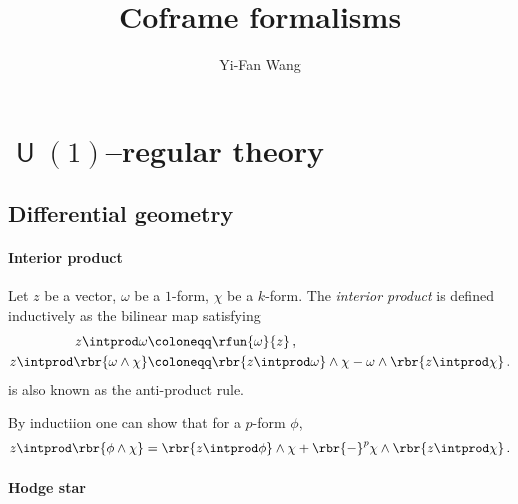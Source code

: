 \documentclass[a4paper]{article}
\title{Coframe formalisms}
\author{Yi-Fan Wang}
\begin{document}
\maketitle


\tableofcontents

\section[$U(1)$--regular theory]{$\msansU(1)$--regular theory}


\subsection{Differential geometry}


\paragraph{Interior product}

Let $z$ be a vector, $\omega$ be a $1$-form, $\chi$ be a $k$-form. 
The \emph{interior product} is defined inductively as the bilinear map
satisfying
\begin{align}
z \intprod \omega &\coloneqq \rfun{\omega}{z}\,, \\
z \intprod \rbr{\omega \wedge \chi} &\coloneqq
	\rbr{z\intprod\omega}\wedge \chi - \omega \wedge \rbr{z\intprod \chi}\,.
\label{eq:anti-prod-100}
\end{align}
 is also known as the anti-product rule.

By inductiion one can show that for a $p$-form $\phi$,
\begin{align}
z \intprod \rbr{\phi \wedge \chi} =
	\rbr{z\intprod\phi}\wedge \chi +
		\rbr{-}^{p} \chi \wedge \rbr{z\intprod \chi}\,.
\end{align}

\paragraph{Hodge star}
\end{document}
